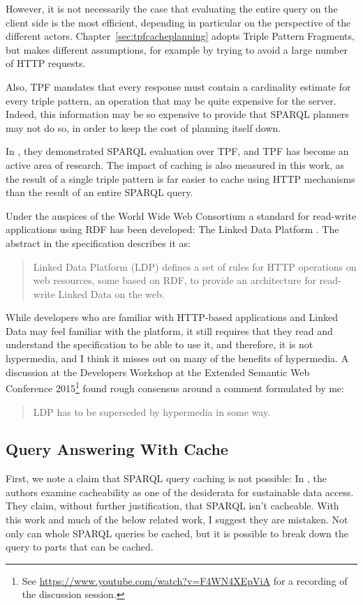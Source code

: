 However, it is not necessarily the case that evaluating the entire
query on the client side is the most efficient, depending in
particular on the perspective of the different
actors. Chapter~\ref{sec:tpfcacheplanning} adopts Triple Pattern
Fragments, but makes different assumptions, for example by trying to avoid a
large number of HTTP requests. 

Also, TPF mandates that every response must contain a cardinality
estimate for every triple pattern, an operation that may be quite
expensive for the server.
Indeed, this information may be so expensive to provide that SPARQL
planners may not do so, in order to keep the cost of planning itself
down.

In \cite{verborgh2014querying}, they demonstrated SPARQL evaluation
over TPF, and TPF has become an active area of research. The impact of
caching is also measured in this work, as the result of a single
triple pattern is far easier to cache using HTTP mechanisms than the
result of an entire SPARQL query.

Under the auspices of the  World Wide Web Consortium a standard for
read-write applications using RDF has been developed: The Linked Data
Platform \cite{ldp1}. The abstract in the specification describes it
as:
\begin{quote}
Linked Data Platform (LDP) defines a set of rules for HTTP operations
on web resources, some based on RDF, to provide an architecture for
read-write Linked Data on the web.
\end{quote}
While developers who are familiar with HTTP-based applications and
Linked Data may feel familiar with the platform, it still requires
that they read and understand the specification to be able to use it,
and therefore, it is not hypermedia, and I think it misses out on many
of the benefits of hypermedia. A discussion at the Developers Workshop
at the Extended Semantic Web Conference 2015\footnote{See
  \url{https://www.youtube.com/watch?v=F4WN4XEpViA} for a recording of
  the discussion session.} found rough consensus around a comment
formulated by me:
\begin{quote}
LDP has to be superseded by hypermedia in some way.
\end{quote}


\subsection{Query Answering With Cache}\label{sec:relcache}

First, we note a claim that SPARQL query caching is not possible:
In \cite{hogan2014paths}, the authors examine cacheability as one of the
desiderata for sustainable data access. They claim, without further
justification, that SPARQL isn't cacheable. With this work and much of
the below related work, I suggest they are mistaken. Not only can
whole SPARQL queries be cached, but it is possible to break down the
query to parts that can be cached.

